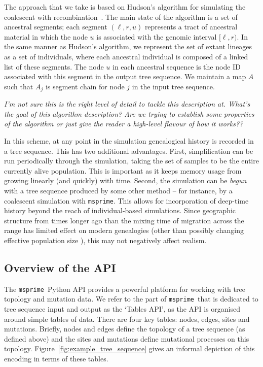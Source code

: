\documentclass{article}
\newcommand{\msprime}{\texttt{msprime}}
\newcommand{\jk}[1]{{\em \color{red} #1}}
\begin{document}
The approach that we take is based on Hudson's algorithm for simulating
the coalescent with
recombination~\citep{hudson1983properties,kelleher2016efficient}. The main
state of the algorithm is a set of ancestral segments; each segment $(\ell, r,
u)$ represents a tract of ancestral material in which the node $u$ is
associated with the genomic interval $[\ell, r)$. In the same manner
as Hudson's algorithm, we represent the set of extant lineages as a
set of individuals, where each ancestral individual is composed of a
linked list of these segments. The node $u$ in each ancestral sequence
is the node ID associated with this segment in the output tree sequence.
We maintain a map $A$ such that $A_j$ is segment chain for node $j$ in
the input tree sequence.

\jk{I'm not sure this is the right level of detail to tackle this description
at. What's the goal of this algorithm description? Are we trying to
establish some properties of the algorithm or just give the reader a high-level
flavour of how it works??}

In this scheme, at any point in the simulation genealogical history is recorded
in a tree sequence. This has two additional advantages. First, simplification
can be run periodically through the simulation, taking the set of samples to be
the entire currently alive population. This is important as it keeps memory
usage from growing linearly (and quickly) with time. Second, the simulation can
be \emph{begun} with a tree sequence produced by some other method -- for
instance, by a coalescent simulation with \msprime. This allows for
incorporation of deep-time history beyond the reach of individual-based
simulations. Since geographic structure from times longer ago than the mixing
time of migration across the range has limited effect on modern genealogies
\citep{wilkins_separation} (other than possibly changing effective population
size \citet{durretspatial}), this may not negatively affect realism.


\subsection*{Overview of the API}

The \msprime\ Python API provides a powerful platform for working with
tree topology and mutation data. We refer to the part of \msprime\
that is dedicated to tree sequence input and output as the `Tables API',
as the API is organised around simple tables of data. There are four key
tables: nodes, edges, sites and mutations. Briefly, nodes and edges define
the topology of a tree sequence (as defined above) and the sites and mutations
define mutational processes on this topology.
Figure~\ref{fig:example_tree_sequence} gives an informal depiction of this
encoding in terms of these tables.
\end{document}
